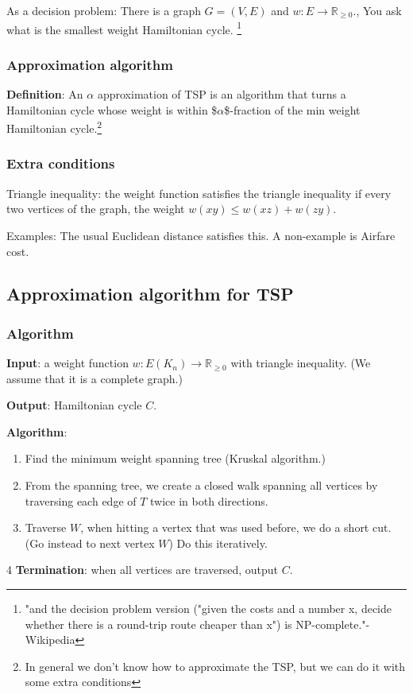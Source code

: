 \documentclass[11pt]{article}
\def\R{\mathbb{R}}
\begin{document}
As a decision problem: There is a graph \(G = (V, E)\) and \(w\colon E
   \rightarrow \R_{\ge 0}\)., You ask what is the smallest weight Hamiltonian cycle. \footnote{"and the decision problem version ("given the costs and a number x, decide
whether there is a round-trip route cheaper than x") is NP-complete."-Wikipedia}
\subsubsection{Approximation algorithm}
\label{sec:orgf9020a8}
\textbf{Definition}: An \(\alpha\) approximation of TSP is an algorithm that turns a
 Hamiltonian cycle whose weight is within \$\(\alpha\)\$-fraction of the min
 weight Hamiltonian cycle.\footnote{In general we don't know how to approximate the TSP, but we can do it with some extra conditions}
\subsubsection{Extra conditions}
\label{sec:org8f90c10}
Triangle inequality: the weight function satisfies the triangle inequality
if every two vertices of the graph, the weight \(w(xy) \le w(xz) + w(zy)\).

Examples: The usual Euclidean distance satisfies this. 
A non-example is Airfare cost.
\subsection{Approximation algorithm for TSP}
\label{sec:org2a26c8b}
\subsubsection{Algorithm}
\label{sec:orgbc47c53}
\textbf{Input}: a weight function \(w\colon E(K_n) \rightarrow \R_{\ge 0}\) with
triangle inequality. (We assume that it is a complete graph.)

\textbf{Output}: Hamiltonian cycle \(C\).

\textbf{Algorithm}:
\begin{enumerate}
\item Find the minimum weight spanning tree (Kruskal algorithm.)
\item From the spanning tree, we create a closed walk spanning all vertices by
traversing each edge of \(T\) twice in both directions.
\item Traverse \(W\), when hitting a vertex that was used before, we do a short
cut. (Go instead to next vertex \(W\)) Do this iteratively.
\end{enumerate}
4 \textbf{Termination}: when all vertices are traversed, output \(C\). 
\end{document}
